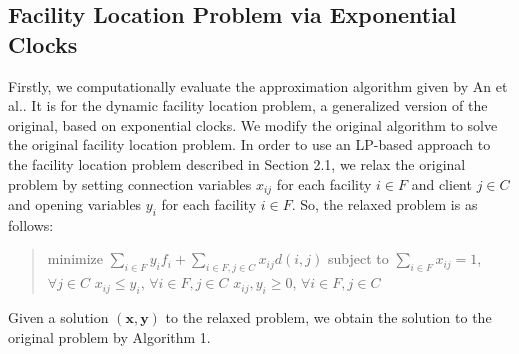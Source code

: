 \documentclass[a4paper]{article}
\begin{document}
\subsection{Facility Location Problem via Exponential Clocks}
%
Firstly, we computationally evaluate the approximation algorithm given by An et al.\cite{an2015dynamic}. It is for the dynamic facility location problem, a generalized version of the original, based on exponential clocks. We modify the original algorithm to solve the original facility location problem.
\newline \indent
In order to use an LP-based approach to the facility location problem described in Section 2.1, we relax the original problem by setting connection variables $x_{ij}$ for each facility $i \in F$ and client $j\in C$ and opening variables $y_{i}$ for each facility $i \in F$. So, the relaxed problem is as follows: 
\begin{quotation}
\noindent
minimize $\sum\limits_{i\in F} y_{i}f_{i} + \sum\limits_{i\in F, j\in C} x_{ij}d(i, j)$
\newline
subject to $\sum\limits_{i\in F} x_{ij} = 1$, $\forall j\in C$
\newline
\indent \indent \indent $x_{ij} \le y_{i}$, $\forall i\in F, j\in C$
\newline
\indent \indent \indent $x_{ij}, y_{i} \ge 0$, $\forall i\in F, j\in C$
\end{quotation}
\indent \indent
Given a solution $(\textbf{x}, \textbf{y})$ to the relaxed problem, we obtain the solution to the original problem by Algorithm 1.
\end{document}
